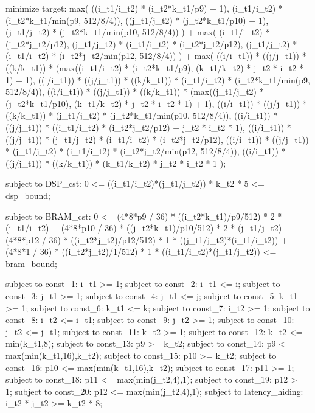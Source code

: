 
minimize target:
max(
	((i_t1/i_t2) * (i_t2*k_t1/p9) + 1),
	(i_t1/i_t2) * (i_t2*k_t1/min(p9, 512/8/4)),
	((j_t1/j_t2) * (j_t2*k_t1/p10) + 1),
	(j_t1/j_t2) * (j_t2*k_t1/min(p10, 512/8/4))
) + 
max(
	(i_t1/i_t2) * (i_t2*j_t2/p12),
	(j_t1/j_t2) * (i_t1/i_t2) * (i_t2*j_t2/p12),
	(j_t1/j_t2) * (i_t1/i_t2) * (i_t2*j_t2/min(p12, 512/8/4))
) + 
max(
	((i/i_t1)) * ((j/j_t1)) * ((k/k_t1)) * (max((i_t1/i_t2) * (i_t2*k_t1/p9), (k_t1/k_t2) * j_t2 * i_t2 * 1) + 1),
	((i/i_t1)) * ((j/j_t1)) * ((k/k_t1)) * (i_t1/i_t2) * (i_t2*k_t1/min(p9, 512/8/4)),
	((i/i_t1)) * ((j/j_t1)) * ((k/k_t1)) * (max((j_t1/j_t2) * (j_t2*k_t1/p10), (k_t1/k_t2) * j_t2 * i_t2 * 1) + 1),
	((i/i_t1)) * ((j/j_t1)) * ((k/k_t1)) * (j_t1/j_t2) * (j_t2*k_t1/min(p10, 512/8/4)),
	((i/i_t1)) * ((j/j_t1)) * ((i_t1/i_t2) * (i_t2*j_t2/p12) + j_t2 * i_t2 * 1),
	((i/i_t1)) * ((j/j_t1)) * (j_t1/j_t2) * (i_t1/i_t2) * (i_t2*j_t2/p12),
	((i/i_t1)) * ((j/j_t1)) * (j_t1/j_t2) * (i_t1/i_t2) * (i_t2*j_t2/min(p12, 512/8/4)),
	((i/i_t1)) * ((j/j_t1)) * ((k/k_t1)) * (k_t1/k_t2) * j_t2 * i_t2 * 1
);

subject to DSP_cst:
	0 <= ((i_t1/i_t2)*(j_t1/j_t2)) * k_t2 * 5 <= dsp_bound;

subject to BRAM_cst:
	0 <= 
	(4*8*p9 / 36) * ((i_t2*k_t1)/p9/512) * 2 * (i_t1/i_t2) + 
	(4*8*p10 / 36) * ((j_t2*k_t1)/p10/512) * 2 * (j_t1/j_t2) + 
	(4*8*p12 / 36) * ((i_t2*j_t2)/p12/512) * 1 * ((j_t1/j_t2)*(i_t1/i_t2)) + 
	(4*8*1 / 36) * ((i_t2*j_t2)/1/512) * 1 * ((i_t1/i_t2)*(j_t1/j_t2))
	<= bram_bound;

subject to const_1:
	i_t1 >= 1;
subject to const_2:
	i_t1 <= i;
subject to const_3:
	j_t1 >= 1;
subject to const_4:
	j_t1 <= j;
subject to const_5:
	k_t1 >= 1;
subject to const_6:
	k_t1 <= k;
subject to const_7:
	i_t2 >= 1;
subject to const_8:
	i_t2 <= i_t1;
subject to const_9:
	j_t2 >= 1;
subject to const_10:
	j_t2 <= j_t1;
subject to const_11:
	k_t2 >= 1;
subject to const_12:
	k_t2 <= min(k_t1,8);
subject to const_13:
	p9 >= k_t2;
subject to const_14:
	p9 <= max(min(k_t1,16),k_t2);
subject to const_15:
	p10 >= k_t2;
subject to const_16:
	p10 <= max(min(k_t1,16),k_t2);
subject to const_17:
	p11 >= 1;
subject to const_18:
	p11 <= max(min(j_t2,4),1);
subject to const_19:
	p12 >= 1;
subject to const_20:
	p12 <= max(min(j_t2,4),1);
subject to latency_hiding:
	i_t2 * j_t2 >= k_t2 * 8;
